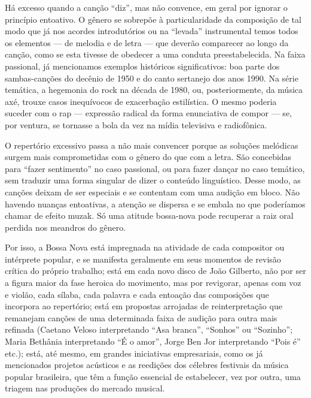 Há excesso quando a canção ``diz'', mas não convence, em geral por
ignorar o princípio entoativo. O gênero se sobrepõe à particularidade da
composição de tal modo que já nos acordes introdutórios ou na ``levada''
instrumental temos todos os elementos --- de melodia e de letra --- que
deverão comparecer ao longo da canção, como se esta tivesse de obedecer
a uma conduta preestabelecida. Na faixa passional, já mencionamos
exemplos históricos significativos: boa parte dos sambas-canções do
decênio de 1950 e do canto sertanejo dos anos 1990. Na série temática, a
hegemonia do rock na década de 1980, ou, posteriormente, da música axé,
trouxe casos inequívocos de exacerbação estilística. O mesmo poderia
suceder com o rap --- expressão radical da forma enunciativa de compor
--- se, por ventura, se tornasse a bola da vez na mídia televisiva e
radiofônica.

O repertório excessivo passa a não mais convencer porque as soluções
melódicas surgem mais comprometidas com o gênero do que com a letra. São
concebidas para ``fazer sentimento'' no caso passional, ou para fazer
dançar no caso temático, sem traduzir uma forma singular de dizer o
conteúdo linguístico. Desse modo, as canções deixam de ser especiais e
se contentam com uma audição em bloco. Não havendo nuanças entoativas, a
atenção se dispersa e se embala no que poderíamos chamar de efeito
muzak. Só uma atitude bossa-nova pode recuperar a raiz oral perdida nos
meandros do gênero.

Por isso, a Bossa Nova está impregnada na atividade de cada compositor
ou intérprete popular, e se manifesta geralmente em seus momentos de
revisão crítica do próprio trabalho; está em cada novo disco de João
Gilberto, não por ser a figura maior da fase heroica do movimento, mas
por revigorar, apenas com voz e violão, cada sílaba, cada palavra e cada
entoação das composições que incorpora ao repertório; está em propostas
arrojadas de reinterpretação que remanejam canções de uma determinada
faixa de audição para outra mais refinada (Caetano Veloso interpretando
``Asa branca'', ``Sonhos'' ou ``Sozinho''; Maria Bethânia interpretando
``É o amor'', Jorge Ben Jor interpretando ``Pois é'' etc.); está, até
mesmo, em grandes iniciativas empresariais, como os já mencionados
projetos acústicos e as reedições dos célebres festivais da música
popular brasileira, que têm a função essencial de estabelecer, vez por
outra, uma triagem nas produções do mercado musical.

